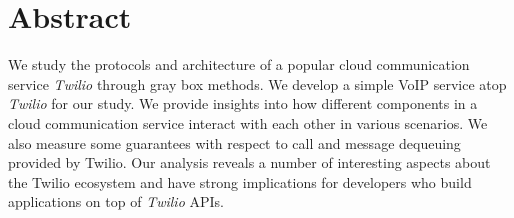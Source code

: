 \section{Abstract}
\label{sec-abstract}
We study the protocols and architecture of a popular cloud communication service \textit{Twilio} through gray box methods. We develop a simple VoIP service atop \textit{Twilio} for our study. We provide insights into how different components in a cloud communication service interact with each other in various scenarios. We also measure some guarantees with respect to call and message dequeuing provided by Twilio. Our analysis reveals a number of interesting aspects about the Twilio ecosystem and have strong implications for developers who build applications on top of \textit{Twilio} APIs.
